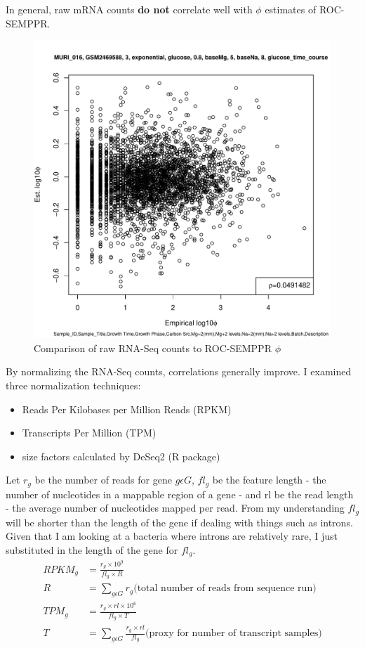 \documentclass[11pt]{labbook}
\begin{document}

In general, raw mRNA counts \textbf{do not} correlate well with $\phi$ estimates of ROC-SEMPPR.
\begin{figure}[H]
\centering
\includegraphics[page=1,scale=0.6]{Ecoli_REL606/GSE94117_mrna_raw.pdf}
\caption{Comparison of raw RNA-Seq counts to ROC-SEMPPR $\phi$}
\end{figure}


By normalizing the RNA-Seq counts, correlations generally improve. I examined three normalization techniques:
\begin{itemize}
\item Reads Per Kilobases per Million Reads (RPKM) 
\item Transcripts Per Million (TPM)
\item size factors calculated by DeSeq2 (R package)
\end{itemize}

Let $r_g$ be the number of reads for gene $g \epsilon G$, $fl_g$ be the feature length - the number of nucleotides in a mappable region of a gene - and rl be the read length - the average number of nucleotides mapped per read. From my understanding $fl_g$ will be shorter than the length of the gene if dealing with things such as introns. Given that I am looking at a bacteria where introns are relatively rare, I just substituted in the length of the gene for $fl_g$.  
\begin{align}
RPKM_g &= \frac{r_g \times 10^9}{fl_g \times R} \\
R & = \sum_{g \epsilon G} r_g \text{(total number of reads from sequence run)}\\
TPM_g &= \frac{r_g \times rl \times 10^6}{fl_g \times T} \\
T &= \sum_{g \epsilon G} \frac{r_g \times rl}{fl_g} \text{(proxy for number of transcript samples)}
\end{align}
 
\end{document}
